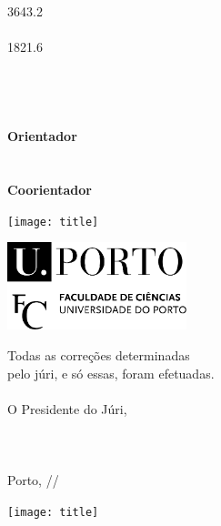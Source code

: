\documentclass[11pt]{article}
\makeatletter
\newcommand\HUGE{\@setfontsize\Huge{36}{43.2}}
\newcommand\LargeA{\@setfontsize\Large{18}{21.6}}
\makeatother
\begin{document}
\pagestyle{empty}
\setlength{\parindent}{0cm}





\hspace{25mm}
\begin{minipage}[b][297mm][t]{125mm}
	\vfill
	\parbox[t][200mm][t]{125mm}{
		\raggedright
		{\HUGE \bfseries \fronttitle} \\
		 {\large~\\}
		{\LargeA \authorname \\} 
		{\large \coursename \\}
		{\small \deptname \\ \the\year \\}
		{\small~\\}
		{\large \bfseries Orientador \\}
		{\small \supervisor \\}
		{\small~\\}
		{\large \bfseries Coorientador \\}
		{\small \cosupervisor}
	}
\end{minipage}
\hfill
\begin{minipage}[b][297mm][b]{54.3mm}
	\texttt{[image: title]}
\end{minipage}

\newpage





\raggedleft
\begin{minipage}[b][297mm][b]{54.3mm}
	\includegraphics[width=52mm]{fcup}

	
	{ \noindent\footnotesize Todas as correções determinadas \\
		pelo júri, e só essas, foram efetuadas. \\
		\\
		O Presidente do Júri, \\
		\\ 
		\\
		\\
		Porto, \underline{\qquad\quad}/\underline{\quad\qquad}/\underline{\qquad\qquad} \\
	}


	\texttt{[image: title]}
\end{minipage}
\end{document}
